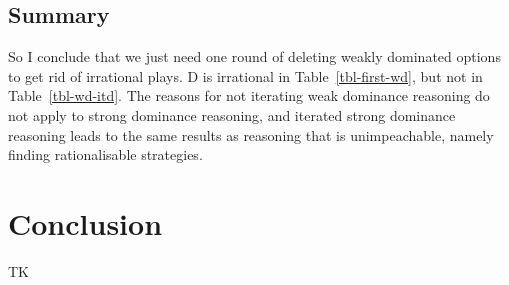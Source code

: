 \documentclass[
  12pt,
  letterpaper,
  DIV=11,
  numbers=noendperiod]{scrreprt}
\begin{document}
\section{Summary}\label{sec-weak-summary}

So I conclude that we just need one round of deleting weakly dominated
options to get rid of irrational plays. D is irrational in
Table~\ref{tbl-first-wd}, but not in Table~\ref{tbl-wd-itd}. The reasons
for not iterating weak dominance reasoning do not apply to strong
dominance reasoning, and iterated strong dominance reasoning leads to
the same results as reasoning that is unimpeachable, namely finding
rationalisable strategies.


\chapter{Conclusion}\label{sec-conclusion}

TK
\end{document}
